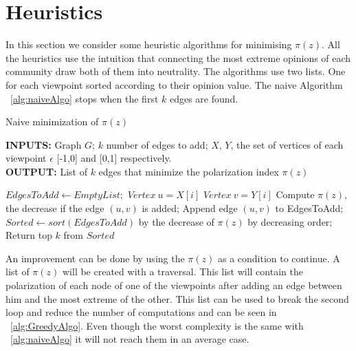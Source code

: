 \clearpage

\section{Heuristics}
\label{sec:heuristics}

In this section we  consider some heuristic algorithms for minimising $\pi(z)$. All the heuristics use the intuition that connecting the most extreme opinions of each community draw both of them into neutrality. The algorithms use two lists. One for each viewpoint sorted according to their opinion value. The naive Algorithm ~\ref{alg:naiveAlgo} stops when the first $k$ edges are found.

\vspace{10pt}

\begin{algorithm}[htbp]
	\caption{Naive minimization of $\pi(z)$}
	\label{alg:naiveAlgo}
	\begin{flushleft}
        		\textbf{INPUTS:} Graph $G$; $k$ number of edges to add;
		$X$, $Y $, the set of vertices of each viewpoint $\epsilon$ [-1,0] and [0,1] respectively.\\
		\vspace{6pt}
        		\textbf{OUTPUT:} List of $k$ edges that minimize the polarization index $\pi(z)$
	\end{flushleft}
	\begin{algorithmic}[1]
		\STATE $EdgesToAdd \leftarrow Empty List;$
		\STATE $Vertex \ u = X[i]$
		\STATE $Vertex \ v = Y[i]$
			\STATE Compute $\pi(z)$, the decrease if the edge $(u,v)$ is added;
			\STATE Append edge $(u,v)$ to EdgesToAdd;
		\ENDIF
		\ENDFOR
		\ENDFOR
		\STATE $Sorted \leftarrow sort(EdgesToAdd)$ by the decrease of $\pi(z)$ by decreasing order;
		\STATE Return top $k$ from $Sorted$
	\end{algorithmic}
\end{algorithm}

An improvement can be done by using the $\pi(z)$ as a condition to continue. A list of $\pi(z)$ will be created with a traversal. This list will contain the polarization of each node of one of the viewpoints after adding an edge between him and the most extreme of the other.
This list can be used to break the second loop and reduce the number of computations and can be seen in ~\ref{alg:GreedyAlgo}. Even though the worst complexity is the same with ~\ref{alg:naiveAlgo} it will not reach them in an average case.

